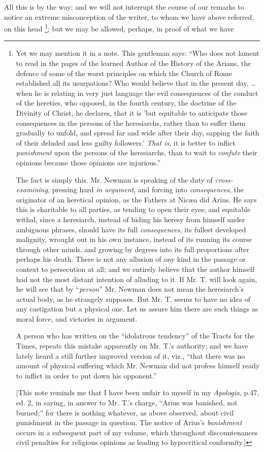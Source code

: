 All this is by the way; and we will not interrupt
the course of our remarks to notice an extreme misconception of the
writer, to whom we have above referred, on this head \footnote{Yet we may mention it in a note. This gentleman says: ``Who does not
lament to read in the pages of the learned Author of the History of
the Arians, the defence of some of the worst principles on which the
Church of Rome established all its usurpations? Who would believe that
in the present day, … when he is relating in very just language the
evil consequences of the conduct of the heretics, who opposed, in the
fourth century, the doctrine of the Divinity of Christ, he declares,
that it is 'but equitable to anticipate those consequences in the
persons of the heresiarchs, rather than to suffer them gradually to
unfold, and spread far and wide after their day, sapping the faith of
their deluded and less guilty followers.' \emph{That is}, it is better
to inflict \emph{punishment} upon the persons of the heresiarchs, than to
wait to \emph{confute} their opinions because those opinions are injurious.''

The fact is simply this. Mr. Newman is speaking
of the duty of \emph{cross-examining}, pressing hard \emph{in argument},
and forcing into \emph{consequences}, the originator of an heretical
opinion, as the Fathers at Nicæa did Arius. He says this is
charitable to all parties, as tending to open their eyes; and
equitable withal, since a heresiarch, instead of hiding his heresy
from himself under ambiguous phrases, should have its full \emph{consequences},
its fullest developed malignity, wrought out in his own instance,
instead of its running its course through other minds, and growing by
degrees into its full proportions after perhaps his death. There is
not any allusion of any kind in the passage or context to persecution
at all; and we entirely believe that the author himself had not the
most distant intention of alluding to it. If Mr. T. will look again,
he will see that by ``\emph{person}'' Mr. Newman does not mean the
heresiarch's actual body, as he strangely supposes. But Mr. T. seems
to have no idea of any castigation but a physical one. Let us assure
him there are such things as moral force, and victories in argument.

A person who has written on the ``idolatrous
tendency'' of the Tracts for the Times, repeats this mistake apparently
on Mr. T.'s authority; and we have lately heard a still further
improved version of it, viz., ``that there was no amount of physical
suffering which Mr. Newman did not profess himself ready to inflict in
order to put down his opponent.''

[This note reminds me that I have been unfair to
myself in my \emph{Apologia}, p.47, ed. 2, in saying, in answer to Mr.
T.'s charge, ``Arius was banished, not burned;'' for there is nothing
whatever, as above observed, about civil punishment in the passage in
question. The notice of Arius's \emph{banishment} occurs in a subsequent part
of my volume, which throughout discountenances civil penalties for
religious opinions as leading to hypocritical conformity.]}; but we may be allowed, perhaps, in proof of what we have
